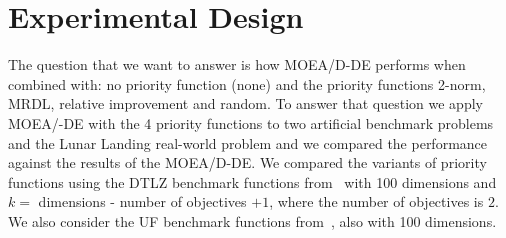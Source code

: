 \section{Experimental Design}

%


The question that we want to answer is how MOEA/D-DE performs when combined with: no priority function (none) and the priority functions 2-norm, MRDL, relative improvement and random. To answer that question we apply MOEA/-DE with the 4 priority functions to two artificial benchmark problems and the Lunar Landing real-world problem and we compared the performance against the results of the MOEA/D-DE. We compared the variants of priority functions using the DTLZ benchmark functions from~\cite{deb2005scalable} with 100 dimensions and $k =$ dimensions - number of objectives $+ 1$, where the number of objectives is $2$. We also consider the UF benchmark functions from~\cite{zhang2008multiobjective}, also with 100 dimensions. 




